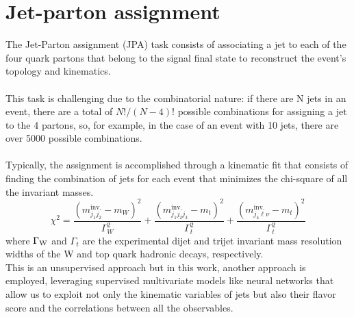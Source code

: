 \section{Jet-parton assignment}
The Jet-Parton assignment (JPA) task consists of associating a jet to each of the four quark partons that belong to the signal final state to reconstruct the event's topology and kinematics.\\
\\
This task is challenging due to the combinatorial nature: if there are N jets in an event, there are a total of $N!/(N-4)!$ possible combinations for assigning a jet to the 4 partons, so, for example, in the case of an event with 10 jets, there are over 5000 possible combinations.\\
\\
Typically, the assignment is accomplished through a kinematic fit that consists of finding the combination of jets for each event that minimizes the chi-square of all the invariant masses.
\begin{equation}
    \chi^2=\frac{(m_{j_1j_2}^{\text{inv.}}-m_W)^2}{\Gamma^2_W}+\frac{(m_{j_1j_2j_3}^{\text{inv.}}-m_t)^2}{\Gamma^2_t}+\frac{(m_{j_4\ell\nu}^{\text{inv.}}-m_t)^2}{\Gamma^2_t}
\end{equation}
where $\Gamma_{\text{W}}$ and $\Gamma_t$ are the experimental dijet and trijet invariant mass resolution widths of the W and top quark hadronic decays, respectively.\\
This is an unsupervised approach but in this work, another approach is employed, leveraging supervised multivariate models like neural networks that allow us to exploit not only the kinematic variables of jets but also their flavor score and the correlations between all the observables.


